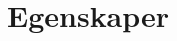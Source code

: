 \documentclass[11pt,a4paper,sans]{moderncv/moderncv}        %
\begin{document}


\section{Egenskaper}

%
\end{document}
